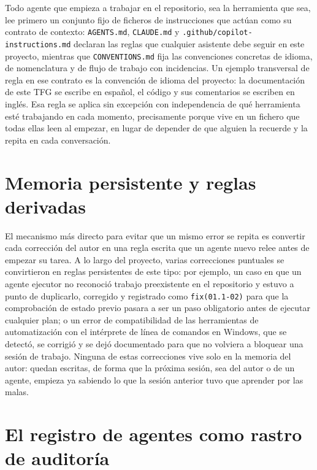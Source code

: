 Todo agente que empieza a trabajar en el repositorio, sea la herramienta que sea, lee primero
un conjunto fijo de ficheros de instrucciones que actúan como su contrato de contexto:
\texttt{AGENTS.md}, \texttt{CLAUDE.md} y \texttt{.github/copilot-instructions.md} declaran las
reglas que cualquier asistente debe seguir en este proyecto, mientras que
\texttt{CONVENTIONS.md} fija las convenciones concretas de idioma, de nomenclatura y de flujo de
trabajo con incidencias. Un ejemplo transversal de regla en ese contrato es la convención de
idioma del proyecto: la documentación de este TFG se escribe en español, el código y sus
comentarios se escriben en inglés. Esa regla se aplica sin excepción con independencia de qué
herramienta esté trabajando en cada momento, precisamente porque vive en un fichero que todas
ellas leen al empezar, en lugar de depender de que alguien la recuerde y la repita en cada
conversación.

\section{Memoria persistente y reglas derivadas}\label{sec:gestion-memoria}

El mecanismo más directo para evitar que un mismo error se repita es convertir cada corrección
del autor en una regla escrita que un agente nuevo relee antes de empezar su tarea. A lo largo
del proyecto, varias correcciones puntuales se convirtieron en reglas persistentes de este
tipo: por ejemplo, un caso en que un agente ejecutor no reconoció trabajo preexistente en el
repositorio y estuvo a punto de duplicarlo, corregido y registrado como \texttt{fix(01.1-02)}
para que la comprobación de estado previo pasara a ser un paso obligatorio antes de ejecutar
cualquier plan; o un error de compatibilidad de las herramientas de automatización con el
intérprete de línea de comandos en Windows, que se detectó, se corrigió y se dejó documentado
para que no volviera a bloquear una sesión de trabajo. Ninguna de estas correcciones vive solo
en la memoria del autor: quedan escritas, de forma que la próxima sesión, sea del autor o de un
agente, empieza ya sabiendo lo que la sesión anterior tuvo que aprender por las malas.

\section{El registro de agentes como rastro de auditoría}\label{sec:gestion-ledger}

